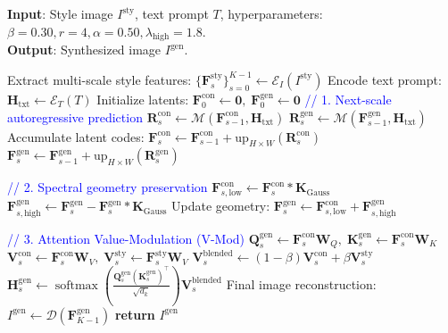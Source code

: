 \documentclass[10pt,twocolumn,letterpaper]{article}
\begin{document}
\begin{algorithm}[t]
\caption{ChronosArt Overall Inference Procedure (Decoupled V-Mod + Spectral Geometry)}
\label{alg:chronosart}
\textbf{Input}: Style image $I^{\text{sty}}$, text prompt $T$, hyperparameters: $\beta=0.30, r=4, \alpha=0.50, \lambda_{\text{high}}=1.8$. \\
\textbf{Output}: Synthesized image $I^{\text{gen}}$.
\begin{algorithmic}[1]
\STATE Extract multi-scale style features: $\{\mathbf{F}_s^{\text{sty}}\}_{s=0}^{K-1} \leftarrow \mathcal{E}_I(I^{\text{sty}})$
\STATE Encode text prompt: $\mathbf{H}_{\text{txt}} \leftarrow \mathcal{E}_T(T)$
\STATE Initialize latents: $\mathbf{F}_0^{\text{con}} \leftarrow \mathbf{0}, \; \mathbf{F}_0^{\text{gen}} \leftarrow \mathbf{0}$
    \STATE \textcolor{blue}{\small // 1. Next-scale autoregressive prediction}
    \STATE $\mathbf{R}_s^{\text{con}} \leftarrow \mathcal{M}(\mathbf{F}_{s-1}^{\text{con}}, \mathbf{H}_{\text{txt}})$
    \STATE $\mathbf{R}_s^{\text{gen}} \leftarrow \mathcal{M}(\mathbf{F}_{s-1}^{\text{gen}}, \mathbf{H}_{\text{txt}})$
    \STATE Accumulate latent codes:
    \STATE $\mathbf{F}_s^{\text{con}} \leftarrow \mathbf{F}_{s-1}^{\text{con}} + \text{up}_{H \times W}(\mathbf{R}_s^{\text{con}})$
    \STATE $\mathbf{F}_s^{\text{gen}} \leftarrow \mathbf{F}_{s-1}^{\text{gen}} + \text{up}_{H \times W}(\mathbf{R}_s^{\text{gen}})$
    
    \STATE \textcolor{blue}{\small // 2. Spectral geometry preservation}
    \STATE $\mathbf{F}_{s, \text{low}}^{\text{con}} \leftarrow \mathbf{F}_s^{\text{con}} * \mathbf{K}_{\text{Gauss}}$
    \STATE $\mathbf{F}_{s, \text{high}}^{\text{gen}} \leftarrow \mathbf{F}_s^{\text{gen}} - \mathbf{F}_s^{\text{gen}} * \mathbf{K}_{\text{Gauss}}$
    \STATE Update geometry: $\mathbf{F}_s^{\text{gen}} \leftarrow \mathbf{F}_{s, \text{low}}^{\text{con}} + \mathbf{F}_{s, \text{high}}^{\text{gen}}$
    
    \STATE \textcolor{blue}{\small // 3. Attention Value-Modulation (V-Mod)}
        \STATE $\mathbf{Q}_s^{\text{gen}} \leftarrow \mathbf{F}_s^{\text{con}} \mathbf{W}_Q, \; \mathbf{K}_s^{\text{gen}} \leftarrow \mathbf{F}_s^{\text{con}} \mathbf{W}_K$
        \STATE $\mathbf{V}_s^{\text{con}} \leftarrow \mathbf{F}_s^{\text{con}} \mathbf{W}_V, \; \mathbf{V}_s^{\text{sty}} \leftarrow \mathbf{F}_s^{\text{sty}} \mathbf{W}_V$
        \STATE $\mathbf{V}_s^{\text{blended}} \leftarrow (1 - \beta)\mathbf{V}_s^{\text{con}} + \beta \mathbf{V}_s^{\text{sty}}$
        \STATE $\mathbf{H}_s^{\text{gen}} \leftarrow \operatorname{softmax}\left(\frac{\mathbf{Q}_s^{\text{gen}}(\mathbf{K}_s^{\text{gen}})^\top}{\sqrt{d_k}}\right) \mathbf{V}_s^{\text{blended}}$
    \ENDIF
\ENDFOR
\STATE Final image reconstruction: $I^{\text{gen}} \leftarrow \mathcal{D}(\mathbf{F}_{K-1}^{\text{gen}})$
\STATE \textbf{return} $I^{\text{gen}}$
\end{algorithmic}
\end{algorithm}
\end{document}
